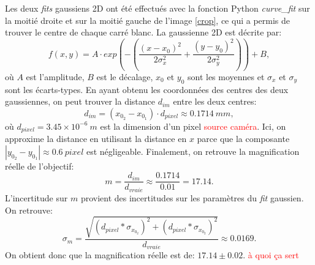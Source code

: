 \documentclass[11pt,letterpaper]{article}
\begin{document}
Les deux \textit{fits} gaussiens 2D ont été effectués avec la fonction Python \textit{curve\_fit} sur la moitié droite et sur la moitié gauche de l'image \ref{crop},
ce qui a permis de trouver le centre de chaque carré blanc. La gaussienne 2D est décrite par:
\begin{equation}
  f(x,y)=A\cdot exp\left(-\left(\frac{(x-x_0)^2}{2\sigma_x^2}+\frac{(y-y_0)^2}{2\sigma_y^2}\right)\right)+B,
\end{equation}
où $A$ est l'amplitude, $B$ est le décalage, $x_0$ et $y_0$ sont les moyennes et $\sigma_x$ et $\sigma_y$ sont les écarts-types.
En ayant obtenu les coordonnées des centres des deux gaussiennes, on peut trouver la distance $d_{im}$ entre les deux centres:
\begin{equation}
  d_{im}=(x_{0_2}-x_{0_1})\cdot d_{pixel}\approx 0.1714\ mm,
\end{equation}
où $d_{pixel}=3.45\times10^{-6} \ m$ est la dimension d'un pixel \textcolor{red}{source caméra}. Ici, on approxime la distance en utilisant la distance en $x$
parce que la composante $|y_{0_2}-y_{0_1}|\approx 0.6\ pixel$ est négligeable. Finalement, on retrouve la magnification réelle de l'objectif:
\begin{equation}
  m=\frac{d_{im}}{d_{vraie}}\approx\frac{0.1714}{0.01}= 17.14.
\end{equation}
L'incertitude sur $m$ provient des incertitudes sur les paramètres du \textit{fit} gaussien. 
On retrouve:
\begin{equation}
  \sigma_m=\frac{\sqrt{(d_{pixel}*\sigma_{x_{0_2}})^2+(d_{pixel}*\sigma_{x_{0_2}})^2}}{d_{vraie}}\approx0.0169.
\end{equation}
On obtient donc que la magnification réelle est de: $17.14\pm0.02$. \textcolor{red}{à quoi ça sert}

\end{document}
